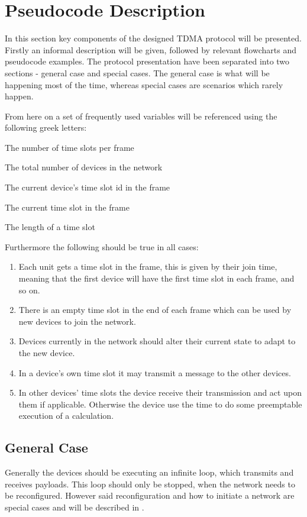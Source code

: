 \section{Pseudocode Description}
In this section key components of the designed TDMA protocol will be presented.
Firstly an informal description will be given, followed by relevant flowcharts and pseudocode examples.
The protocol presentation have been separated into two sections - general case and special cases. 
The general case is what will be happening most of the time, whereas special cases are scenarios which rarely happen. 

From here on a set of frequently used variables will be referenced using the following greek letters: 
\begin{description}[labelindent=\parindent]
    \item[$n$] The number of time slots per frame
    \item[$d$] The total number of devices in the network
    \item[$k$] The current device's time slot id in the frame
    \item[$i$] The current time slot in the frame
    \item[$\delta$] The length of a time slot
\end{description}  
\noindent
Furthermore the following should be true in all cases: 
\begin{enumerate}[label=\itshape \alph*\upshape)]
    \item Each unit gets a time slot in the frame, this is given by their join time, meaning that the first device will have the first time slot in each frame, and so on.
    \item There is an empty time slot in the end of each frame which can be used by new devices to join the network.
    \item Devices currently in the network should alter their current state to adapt to the new device.
    \item In a device's own time slot it may transmit a message to the other devices.
    \item In other devices' time slots the device receive their transmission and act upon them if applicable. Otherwise the device use the time to do some preemptable execution of a calculation.
\end{enumerate}
                    
\subsection{General Case} %
\label{sub:general_case}
Generally the devices should be executing an infinite loop, which transmits and receives payloads.
This loop should only be stopped, when the network needs to be reconfigured.
However said reconfiguration and how to initiate a network are special cases and will be described in .

